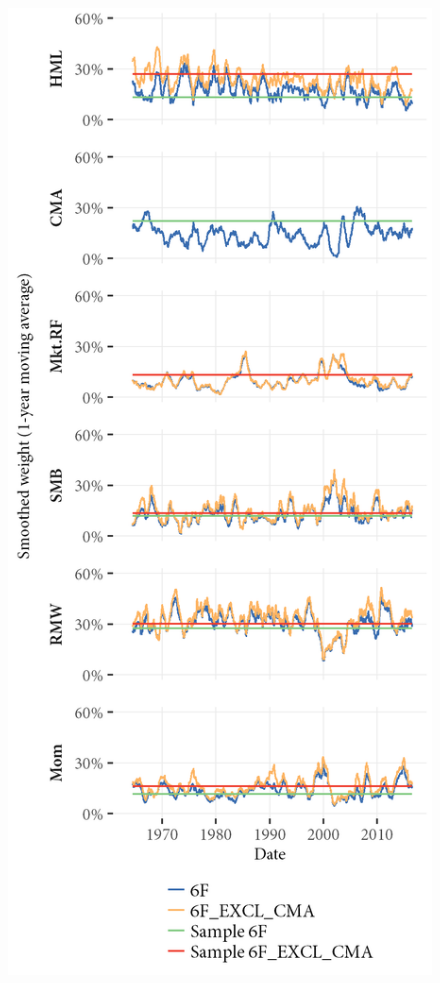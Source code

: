 \begin{figure}[htbp]
  \includegraphics[scale = 1]{graphics/Weights_6F_EXCL_CMA_6F.png}
\end{figure}



